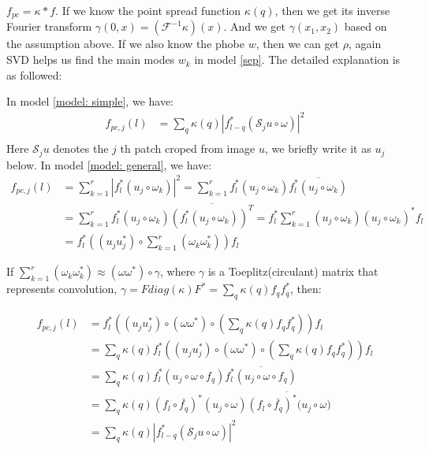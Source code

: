 \documentclass{article}
\numberwithin{equation}{section}
\begin{document}
$f_{pc} = \kappa * f $. If we know the point spread function $\kappa(q)$, then we get its inverse Fourier transform $\gamma(0,x) = (\mathcal{F}^{-1}\kappa)(x)$. And we get $\gamma(x_1,x_2)$ based on the assumption above.  If we also know the phobe $w$, then we can get $\rho$, again SVD helps us find the main modes $w_k$ in model \eqref{sep}. The detailed explanation is as followed:

In model \ref{model: simple}, we have:
$$
\begin{aligned}
f_{pc,j}(l)  &= \sum_{q} \kappa(q)  |f_{l-q}^{*} (\mathcal{S}_j u  \circ \omega) |^2  \\
 \end{aligned}
$$
Here $\mathcal{S}_j u $ denotes the $j$ th patch croped from image $u$, we briefly write it as $u_j$ below.
In model \ref{model: general}, we have:
$$
\begin{aligned}
	f_{pc,j}(l)  &= \sum_{k=1}^{r}  | f_{l}^{*} (u_j  \circ \omega_k)|^2= \sum_{k=1}^{r}   f_{l}^{*} (u_j  \circ \omega_k)  \overline{ f_{l}^{*} (u_j  \circ \omega_k)} \\
	&= \sum_{k=1}^{r}   f_{l}^{*} (u_j  \circ \omega_k)  \overline{ ( f_{l}^{*} (u_j  \circ \omega_k) )^T} 
	=f_l ^*  \sum_{k=1}^{r}  (u_j  \circ \omega_k) (u_j  \circ \omega_k)^*      f_l \\
	&= f_l ^*( (u_j u_j^*) \circ  \sum_{k=1}^{r} ( \omega_k \omega_k^*)  )    f_l 
\end{aligned}
$$

If  $ \sum_{k=1}^{r} ( \omega_k \omega_k^*) \approx (\omega \omega^*) \circ \gamma$, where $\gamma$ is a Toeplitz(circulant) matrix that represents convolution, $\gamma = F diag(\kappa)  F^* = \sum_{q} \kappa(q) f_q f_q^*$, then:

$$
\begin{aligned}
	f_{pc,j}(l)  & = f_l ^*( (u_j u_j^*) \circ  (\omega \omega^*)  \circ (\sum_{q} \kappa(q) f_q f_q^*) )    f_l  \\
	&= \sum_{q} \kappa(q) f_l ^*( (u_j u_j^*) \circ  (\omega \omega^*)  \circ (\sum_{q} \kappa(q) f_q f_q^*) )   f_l\\
	&= \sum_{q} \kappa(q) f_l^*(u_j \circ \omega \circ f_q) \overline{f_l^*(u_j \circ \omega \circ f_q)} \\
	&= \sum_{q} \kappa(q) (f_l \circ \bar{f_q})^*(u_j \circ \omega ) \overline{(f_l \circ \bar{f_q})^*(u_j \circ \omega} ) \\
	&= \sum_{q} \kappa(q) |f_{l-q}^{*} (\mathcal{S}_j u  \circ \omega) |^2 
\end{aligned}
$$
\end{document}
